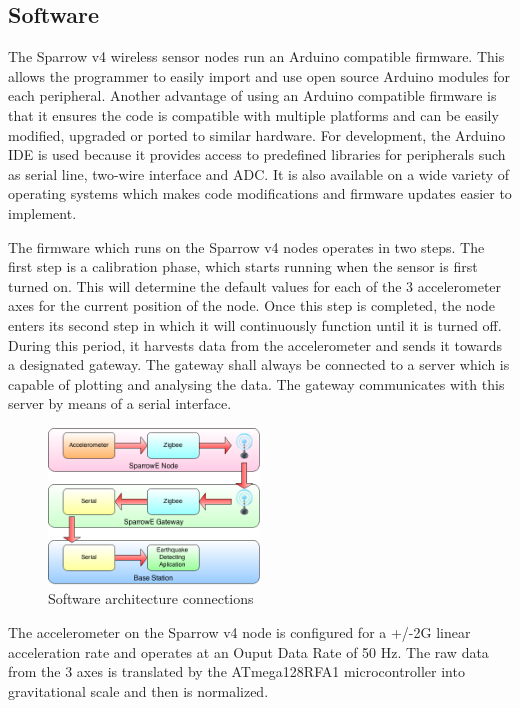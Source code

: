\subsection{Software}

The Sparrow v4 wireless sensor nodes run an Arduino\cite{arduino} compatible firmware. This allows the programmer to easily import 
and use open source Arduino modules for each peripheral. Another advantage of using an Arduino compatible firmware is that it ensures the code is 
compatible with multiple platforms and can be easily modified, upgraded or ported to similar hardware. For development, the Arduino IDE is used 
because it provides access to predefined libraries for peripherals such as serial line, two-wire interface and ADC. It is also available on a wide 
variety of operating systems which makes code modifications and firmware updates easier to implement.

The firmware which runs on the Sparrow v4 nodes operates in two steps. The first step is a calibration phase, which starts running when the sensor 
is first turned on. This will determine the default values for each of the 3 accelerometer axes for the current position of the node. Once this step 
is completed, the node enters its second step in which it will continuously function until it is turned off. During this period, it harvests data 
from the accelerometer and sends it towards a designated gateway. The gateway shall always be connected to a server 
which is capable of plotting and analysing the data. The gateway communicates with this server by means of a serial interface.

\begin{figure}[ht] \centering
  \includegraphics[width=0.5\textwidth]{img/software-architecture.png}
  \caption{Software architecture connections}
\end{figure}

The accelerometer on the Sparrow v4 node is configured for a +/-2G linear acceleration rate and operates at an Ouput Data Rate of 50 Hz. 
The raw data from the 3 axes is translated by the ATmega128RFA1 microcontroller into gravitational scale and then is normalized.

